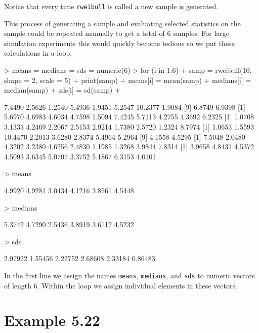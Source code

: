 \documentclass{book}
\begin{document}
Notice that every time \texttt{rweibull} is called a new sample is generated.

This process of generating a sample and evaluating selected statistics
on the sample could be repeated manually to get a total of 6 samples.
For large simulation experiments this would quickly become tedious so
we put these calculations in a loop.
\begin{Schunk}
\begin{Sinput}
> means = medians = sds = numeric(6)
> for (i in 1:6) {
+     samp = rweibull(10, shape = 2, scale = 5)
+     print(samp)
+     means[i] = mean(samp)
+     medians[i] = median(samp)
+     sds[i] = sd(samp)
+ }
\end{Sinput}
\begin{Soutput}
 [1]  7.4490  2.5626  1.2540  5.4936  1.9451  5.2547 10.2377  1.9084
 [9]  6.8749  6.9398
 [1] 5.6970 4.6983 4.6034 4.7598 1.5094 7.4245 5.7113 4.2755 4.3692 6.2325
 [1] 1.0708 3.1333 4.2469 2.2067 2.5153 2.9214 1.7380 2.5720 1.2324 8.7974
 [1]  1.0653  1.5593 10.4470  2.2013  3.6280  2.8374  5.4964  5.2964
 [9]  4.1558  4.5295
 [1] 7.5048 2.0480 4.3202 3.2380 4.6256 2.4830 1.1985 1.3268 3.9844 7.8314
 [1] 3.9658 4.8431 4.5372 4.5093 3.6345 5.0707 3.3752 5.1867 6.3153 4.0101
\end{Soutput}
\begin{Sinput}
> means
\end{Sinput}
\begin{Soutput}
[1] 4.9920 4.9281 3.0434 4.1216 3.8561 4.5448
\end{Soutput}
\begin{Sinput}
> medians
\end{Sinput}
\begin{Soutput}
[1] 5.3742 4.7290 2.5436 3.8919 3.6112 4.5232
\end{Soutput}
\begin{Sinput}
> sds
\end{Sinput}
\begin{Soutput}
[1] 2.97922 1.55456 2.22752 2.68608 2.33184 0.86483
\end{Soutput}
\end{Schunk}
In the first line we assign the names \texttt{means},
\texttt{medians}, and \texttt{sds} to numeric vectors of length 6.
Within the loop we assign individual elements in these vectors.


\section{Example 5.22}
\label{sec:xmp0522}
\end{document}

